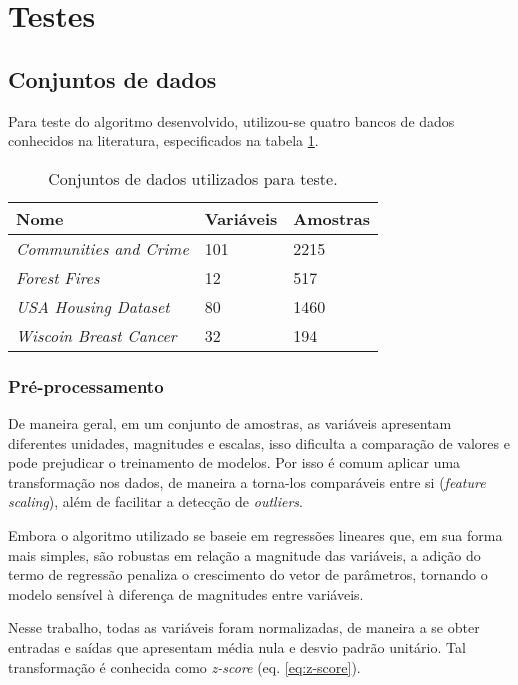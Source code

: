 \section{Testes}

\subsection{Conjuntos de dados}

Para teste do algoritmo desenvolvido, utilizou-se quatro bancos de dados conhecidos na literatura, 
especificados na tabela \ref{tbl:datasets}.
\begin{table}[H]
    \caption{Conjuntos de dados utilizados para teste.}
    \centering
    \begin{tabular}{@{}lll@{}}
    \toprule
    Nome                           & Variáveis & Amostras \\ \midrule
    \textit{Communities and Crime} \cite{ds_crime} & 101       & 2215     \\
    \textit{Forest Fires} \cite{ds_forest}         & 12        & 517      \\
    \textit{USA Housing Dataset} \cite{ds_house}   & 80        & 1460     \\
    \textit{Wiscoin Breast Cancer} \cite{ds_cancer}& 32        & 194      \\ \bottomrule
    \end{tabular}
    \label{tbl:datasets}
\end{table}

\subsubsection{Pré-processamento}

De maneira geral, em um conjunto de amostras, as variáveis apresentam diferentes unidades, magnitudes e escalas, isso dificulta a comparação de valores e pode prejudicar o treinamento de modelos. Por isso é comum aplicar uma transformação nos dados, de maneira a torna-los comparáveis entre si (\textit{feature scaling}), além de facilitar a detecção de \textit{outliers}.

Embora o algoritmo utilizado se baseie em regressões lineares que, em sua forma mais simples, são robustas em  relação a magnitude das variáveis, a adição do termo de regressão penaliza o crescimento do vetor de parâmetros, tornando o modelo sensível à diferença de magnitudes entre variáveis.

Nesse trabalho, todas as variáveis foram normalizadas, de maneira a se obter entradas e saídas que apresentam média nula e desvio padrão unitário. Tal transformação é conhecida como \textit{z-score} (eq. \ref{eq:z-score}).

